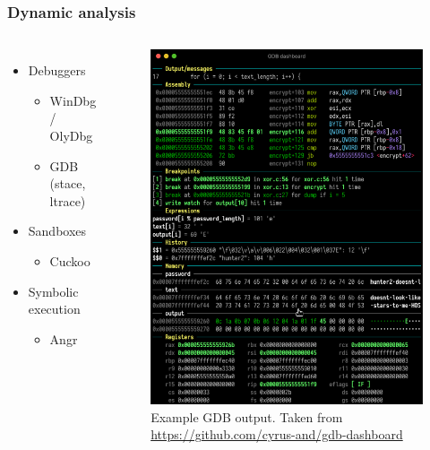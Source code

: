 \documentclass[10pt,xcolor=pdflatex]{beamer}
\begin{document}
\begin{frame}\frametitle{Dynamic analysis}

  \begin{columns}
    \begin{itemize}
        \item Debuggers
            \begin{itemize}

                \item WinDbg / OlyDbg

                \item GDB (stace, ltrace)
                
            \end{itemize}
        \hfill
        \item Sandboxes
            \begin{itemize}

                \item Cuckoo

            \end{itemize}
        \hfill
        \item Symbolic execution
            \begin{itemize}

                \item Angr

            \end{itemize}
    \end{itemize}
    \begin{figure}
      \centering
      \includegraphics[width=.8\textwidth]{../images/gdb.png}
      \caption{Example GDB output. \tiny Taken from \url{https://github.com/cyrus-and/gdb-dashboard}}
    \end{figure}
  \end{columns}

\end{frame}
\end{document}
